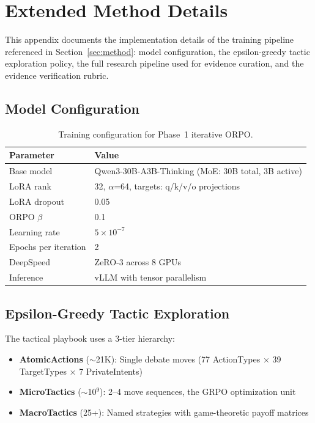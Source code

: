 \section{Extended Method Details}
\label{app:method_details}

This appendix documents the implementation details of the training pipeline
referenced in Section~\ref{sec:method}: model configuration, the epsilon-greedy
tactic exploration policy, the full research pipeline used for evidence curation,
and the evidence verification rubric.

\subsection{Model Configuration}

\begin{table}[h]
\centering
\small
\begin{tabular}{ll}
\toprule
\textbf{Parameter} & \textbf{Value} \\
\midrule
Base model & Qwen3-30B-A3B-Thinking (MoE: 30B total, 3B active) \\
LoRA rank & 32, $\alpha$=64, targets: q/k/v/o projections \\
LoRA dropout & 0.05 \\
ORPO $\beta$ & 0.1 \\
Learning rate & $5 \times 10^{-7}$ \\
Epochs per iteration & 2 \\
DeepSpeed & ZeRO-3 across 8 GPUs \\
Inference & vLLM with tensor parallelism \\
\bottomrule
\end{tabular}
\caption{Training configuration for Phase~1 iterative ORPO.}
\label{tab:model_config}
\end{table}

\subsection{Epsilon-Greedy Tactic Exploration}

The tactical playbook uses a 3-tier hierarchy:
\begin{itemize}
    \item \textbf{AtomicActions} ($\sim$21K): Single debate moves (77 ActionTypes $\times$ 39 TargetTypes $\times$ 7 PrivateIntents)
    \item \textbf{MicroTactics} ($\sim$10$^9$): 2--4 move sequences, the GRPO optimization unit
    \item \textbf{MacroTactics} (25+): Named strategies with game-theoretic payoff matrices
\end{itemize}

